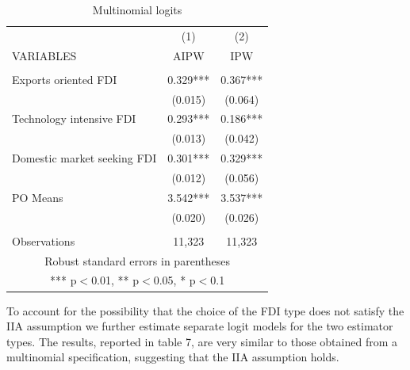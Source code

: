 \documentclass[a4paper,12pt]{scrartcl}
\begin{document}
\begin{table}

  \centering
   \caption{Multinomial logits} 
  \label{} 
  \begin{tabular}{lcc} \hline
 & (1) & (2)  \\
VARIABLES & AIPW & IPW \\ \hline
 &    &  \\
Exports oriented FDI & 0.329*** &   0.367***   \\
 & (0.015)   & (0.064)  \\
Technology intensive FDI & 0.293*** &   0.186***   \\
 & (0.013)   & (0.042)   \\
Domestic market seeking FDI  & 0.301*** &   0.329***  \\
 & (0.012) &  (0.056)   \\
PO Means & 3.542***  & 3.537***    \\
 &   (0.020) &   (0.026) \\
 &  &      \\
 Observations & 11,323  & 11,323  \\ \hline
\multicolumn{3}{c}{ Robust standard errors in parentheses} \\
\multicolumn{3}{c}{ *** p$<$0.01, ** p$<$0.05, * p$<$0.1} \\
\end{tabular}
\end{table}




To account for the possibility that the choice of the FDI type does not satisfy the IIA assumption we further estimate separate logit models for the two estimator types. The results, reported in table 7, are very similar to those obtained from a multinomial specification, suggesting that the IIA assumption holds. 
\end{document}

